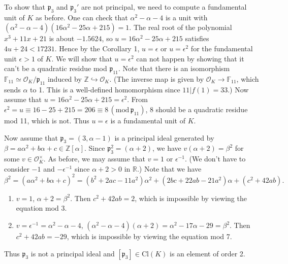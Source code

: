 \documentclass{article}
\newcommand{\Cl}{\mathrm{Cl}}
\newcommand{\Mod}[1]{\,(\mathrm{mod}\,#1)}
\begin{document}
To show that $\mathfrak{p}_{3}$ and $\mathfrak{p}_{3}'$ are not principal, we need to compute a fundamental unit of $K$ as before. 
One can check that $\alpha^{2} - \alpha - 4$ is a unit with $(\alpha^{2} - \alpha - 4)(16\alpha^{2}- 25\alpha + 215) =1$. 
The real root of the polynomial $x^{3} + 11x +21$ is about $-1.5624$, so $u = 16\alpha^{2}-25\alpha + 215$ satisfies $4u + 24 < 17231$. 
Hence by the Corollary 1, $u = \epsilon $ or $ u = \epsilon^{2}$ for the fundamental unit $\epsilon >1$ of $K$. 
We will show that $u=\epsilon^{2}$ can not happen by showing that it can't be a quadratic residue mod $\mathfrak{p}_{11}$. Note that there is an isomorphism $\mathbb{F}_{11} \simeq \mathcal{O}_{K}/\mathfrak{p}_{11}$ induced by $\mathbb{Z}\hookrightarrow \mathcal{O}_{K}$. (The inverse map is given by $\mathcal{O}_{K}\to \mathbb{F}_{11}$, which sends $\alpha$ to 1. This is a well-defined homomorphism since $11|f(1) = 33$.) Now assume that $u = 16\alpha^{2} - 25\alpha + 215 = \epsilon^{2}$. From $\epsilon^{2} = u\equiv 16 - 25 + 215 = 206 \equiv 8\Mod{\mathfrak{p}_{11}}$, 8 should be a quadratic residue mod 11, which is not. 
Thus $u = \epsilon$ is a fundamental unit of $K$. 

Now assume that $\mathfrak{p}_{3}= (3, \alpha -1)$ is a principal ideal generated by $\beta = a\alpha^{2} + b\alpha + c\in \mathbb{Z}[\alpha]$. Since $\mathfrak{p}_{3}^{2} = (\alpha + 2)$, we have $v(\alpha + 2) = \beta^{2}$ for some $v\in \mathcal{O}_{K}^{\times}$. As before, we may assume that $v = 1$ or $\epsilon^{-1}$. (We don't have to consider $-1$ and $-\epsilon^{-1}$ since $\alpha + 2 > 0$ in $\mathbb{R}$.) Note that we have
$$
\beta^{2} = (a\alpha^{2} + b\alpha + c)^{2} = (b^{2} +2ac - 11a^{2})\alpha^{2} + (2bc + 22ab -21a^{2})\alpha + (c^{2} +42ab).
$$ 
\begin{enumerate}
\item $v=1$, $\alpha + 2 = \beta^{2}$. Then $c^{2} + 42ab = 2$, which is impossible by viewing the equation mod 3. 
\item $v = \epsilon^{-1} = \alpha^{2} -\alpha - 4$, $(\alpha^{2}-\alpha-4)(\alpha+2) = \alpha^{2} - 17\alpha - 29 = \beta^{2}$. Then $c^{2} + 42ab = -29$, which is impossible by viewing the equation mod 7.  
\end{enumerate}
Thus $\mathfrak{p}_{3}$ is not a principal ideal and $[\mathfrak{p}_{3}]\in\Cl(K)$ is an element of order 2.
\end{document}
